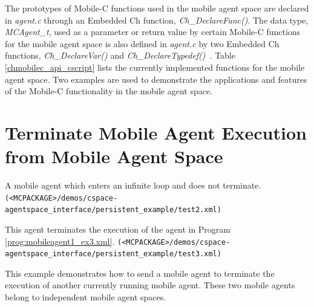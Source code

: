 \documentclass[11pt]{report}
\begin{document}
The prototypes of Mobile-C functions used in the mobile agent space are
declared in \textit{agent.c} through an Embedded Ch function,
\textit{Ch\_DeclareFunc()}.
The data type, \textit{MCAgent\_t}, used as a parameter or return value by 
certain Mobile-C functions for the mobile agent space is also defined in 
\textit{agent.c} by two Embedded Ch functions, 
\textit{Ch\_DeclareVar()} and \textit{Ch\_DeclareTypedef()}~\cite{EmbeddedCh}.
Table \vref{chmobilec_api_cscript} lists the currently implemented functions 
for the mobile agent space.
Two examples are used to demonstrate the applications and features of the 
Mobile-C functionality in the mobile agent space. 

\noindent
\section{Terminate Mobile Agent Execution from Mobile Agent Space}
\begin{Program}[!t]
\begin{center}
   {\footnotesize \linespread{1.0} 
     }
\end{center}
\caption{A mobile agent which enters an infinite loop and does 
  not terminate. \texttt{(<MCPACKAGE>/demos/cspace-agentspace\_interface/persistent\_example/test2.xml)}}
\label{prog:mobileagent1_ex3.xml}
\end{Program}
\begin{Program}[!t]
\begin{center}
   {\footnotesize \linespread{1.0} 
     }
\end{center}
\caption{ This agent terminates the execution
of the agent in Program \ref{prog:mobileagent1_ex3.xml}. 
  \texttt{(<MCPACKAGE>/demos/cspace-agentspace\_interface/persistent\_example/test3.xml)}}
\label{prog:mobileagent2_ex3.xml}
\end{Program}

This example demonstrates how to send a mobile agent to terminate the 
execution of another currently running mobile agent. 
These two mobile agents belong to independent mobile agent spaces. 
\end{document}
